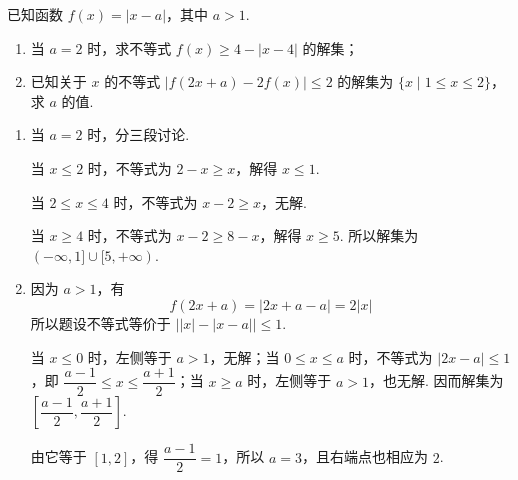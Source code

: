 \begin{problem}
已知函数 \(f(x) = |x - a|\)，其中 \(a > 1\).

\begin{enumerate}
\item 当 \(a = 2\) 时，求不等式 \(f(x) \geqslant 4 - |x - 4|\) 的解集；
\item 已知关于 \(x\) 的不等式 \(\left|f(2x + a) - 2f(x)\right| \leqslant 2\) 的解集为 \(\{x \mid 1 \leqslant x \leqslant 2\}\)，求 \(a\) 的值.
\end{enumerate}
\end{problem}

\begin{solution}
\begin{enumerate}
\item 当 \(a=2\) 时，分三段讨论.

当 \(x\leqslant2\) 时，不等式为 \(2-x\geqslant x\)，解得 \(x\leqslant1\).

当 \(2\leqslant x\leqslant4\) 时，不等式为 \(x-2\geqslant x\)，无解.

当 \(x\geqslant4\) 时，不等式为 \(x-2\geqslant8-x\)，解得 \(x\geqslant5\). 所以解集为 \((-\infty,1]\cup[5,+\infty)\).

\item 因为 \(a>1\)，有
\[
f(2x+a)=\lvert2x+a-a\rvert=2\lvert x\rvert
\]
所以题设不等式等价于 \(\bigl\lvert\lvert x\rvert-\lvert x-a\rvert\bigr\rvert\leqslant1\).

当 \(x\leqslant0\) 时，左侧等于 \(a>1\)，无解；当 \(0\leqslant x\leqslant a\) 时，不等式为 \(\lvert2x-a\rvert\leqslant1\)，即 \(\dfrac{a-1}{2}\leqslant x\leqslant\dfrac{a+1}{2}\)；当 \(x\geqslant a\) 时，左侧等于 \(a>1\)，也无解. 因而解集为 \(\left[\dfrac{a-1}{2},\dfrac{a+1}{2}\right]\).

由它等于 \([1,2]\)，得 \(\dfrac{a-1}{2}=1\)，所以 \(a=3\)，且右端点也相应为 \(2\).
\end{enumerate}
\end{solution}
